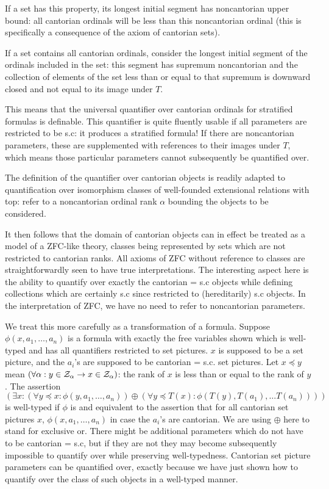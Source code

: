 \documentclass[12pt]{article}
\begin{document}
If a set has this property, its longest initial segment has noncantorian upper bound:  all cantorian ordinals will be less than this noncantorian ordinal (this is specifically a consequence of the axiom of cantorian sets).

If a set contains all cantorian ordinals, consider the longest initial segment of the ordinals included in the set:  this segment has supremum noncantorian and the collection of elements of the set less than or equal to that supremum is downward closed and not equal to its image under $T$.

This means that the universal quantifier over cantorian ordinals for stratified formulas is definable.  This quantifier is quite fluently usable if all parameters are restricted to be s.c:  it produces a stratified formula!  If there are noncantorian parameters,
these are supplemented with references to their images under $T$, which means those particular parameters cannot subsequently be quantified over.

The definition of the quantifier over cantorian objects is readily adapted to quantification over isomorphism classes of well-founded extensional relations with top:  refer to a noncantorian ordinal rank $\alpha$ bounding the objects to be considered.

It then follows that the domain of cantorian objects can in effect be treated as a model of a ZFC-like theory, classes being represented by sets which are not restricted to cantorian ranks.  All axioms of ZFC without reference to classes
are straightforwardly seen to have true interpretations.  The interesting aspect here is the ability to quantify over exactly the cantorian = s.c objects while defining collections which are certainly s.c since restricted to (hereditarily) s.c objects.  In the interpretation of ZFC, we have no need to refer to noncantorian parameters.

We treat this more carefully as a transformation of a formula.  Suppose $\phi(x,a_1,\ldots,a_n)$ is a formula with exactly the free variables shown which is well-typed and has all quantifiers restricted to set pictures.  $x$ is supposed to be a set picture,
and the $a_i$'s are supposed to be cantorian = s.c. set pictures.  Let $x \preceq y$ mean $(\forall \alpha:y \in {\cal Z}_\alpha \rightarrow x \in {\cal Z}_\alpha)$:  the rank of $x$ is less than or equal to the rank of $y$.  The assertion
$$(\exists x:(\forall y \preceq x:\phi(y,a_1,\ldots,a_n)) \oplus (\forall y \preceq T(x):\phi(T(y),T(a_1),\ldots T(a_n))))$$ is well-typed if $\phi$ is and equivalent to the assertion that for all cantorian set pictures $x$, $\phi(x,a_1,\ldots,a_n)$ in case
the $a_i$'s are cantorian.  We are using $\oplus$ here to stand for exclusive or.  There might be additional  parameters which do not have to be cantorian = s.c, but if they are not they may become subsequently impossible to quantify over while preserving well-typedness.  Cantorian set picture parameters can be quantified over, exactly because we have just shown how to quantify over the class of such objects in a well-typed manner.
\end{document}
